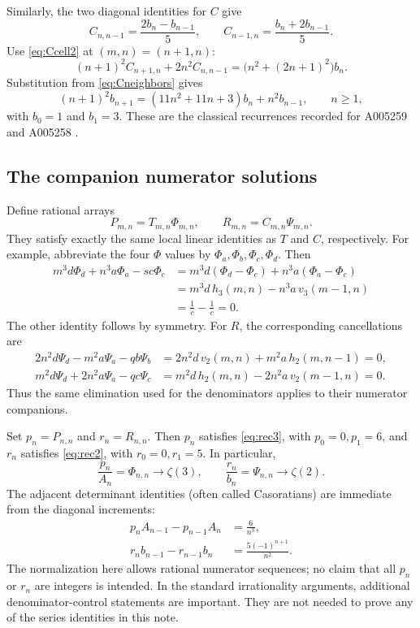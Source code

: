 \documentclass[11pt,letterpaper]{article}
\numberwithin{equation}{section}
\theoremstyle{definition}
\newcommand{\zthree}{\zeta(3)}
\newcommand{\ztwo}{\zeta(2)}
\begin{document}
Similarly, the two diagonal identities for $C$ give
\begin{equation}\label{eq:Cneighbors}
 C_{n,n-1}=\frac{2b_n-b_{n-1}}5,\qquad
 C_{n-1,n}=\frac{b_n+2b_{n-1}}5.
\end{equation}
Use \eqref{eq:Ccell2} at $(m,n)=(n+1,n)$:
\[
 (n+1)^2C_{n+1,n}+2n^2C_{n,n-1}
 =\bigl(n^2+(2n+1)^2\bigr)b_n.
\]
Substitution from \eqref{eq:Cneighbors} gives
\begin{equation}\label{eq:rec2}
 (n+1)^2b_{n+1}=(11n^2+11n+3)b_n+n^2b_{n-1},
 \qquad n\geq1,
\end{equation}
with $b_0=1$ and $b_1=3$. These are the classical recurrences recorded
for A005259 and A005258 \cite{oeis259,oeis258}.

\subsection{The companion numerator solutions}

Define rational arrays
\begin{equation}\label{eq:numerators}
 P_{m,n}=T_{m,n}\Phi_{m,n},\qquad R_{m,n}=C_{m,n}\Psi_{m,n}.
\end{equation}
They satisfy exactly the same local linear identities as $T$ and $C$,
respectively. For example, abbreviate the four $\Phi$ values by
$\Phi_a,\Phi_b,\Phi_c,\Phi_d$. Then
\begin{align*}
 m^3d\Phi_d+n^3a\Phi_a-sc\Phi_c
 &=m^3d(\Phi_d-\Phi_c)+n^3a(\Phi_a-\Phi_c)\\
 &=m^3d\,h_3(m,n)-n^3a\,v_3(m-1,n)\\
 &=\frac1c-\frac1c=0.
\end{align*}
The other identity follows by symmetry.
For $R$, the corresponding cancellations are
\begin{align*}
 2n^2d\Psi_d-m^2a\Psi_a-qb\Psi_b
 &=2n^2d\,v_2(m,n)+m^2a\,h_2(m,n-1)=0,\\
 m^2d\Psi_d+2n^2a\Psi_a-qc\Psi_c
 &=m^2d\,h_2(m,n)-2n^2a\,v_2(m-1,n)=0.
\end{align*}
Thus the same elimination used for the denominators applies to their
numerator companions.

Set $p_n=P_{n,n}$ and $r_n=R_{n,n}$. Then $p_n$ satisfies
\eqref{eq:rec3}, with $p_0=0,p_1=6$, and $r_n$ satisfies
\eqref{eq:rec2}, with $r_0=0,r_1=5$. In particular,
\[
 \frac{p_n}{A_n}=\Phi_{n,n}\longrightarrow\zthree,\qquad
 \frac{r_n}{b_n}=\Psi_{n,n}\longrightarrow\ztwo.
\]
The adjacent determinant identities (often called Casoratians) are
immediate from the diagonal increments:
\begin{align}
 p_nA_{n-1}-p_{n-1}A_n&=\frac6{n^3},\label{eq:cas3}\\
 r_nb_{n-1}-r_{n-1}b_n&=\frac{5(-1)^{n+1}}{n^2}.\label{eq:cas2}
\end{align}
The normalization here allows rational numerator sequences; no claim
that all $p_n$ or $r_n$ are integers is intended. In the standard
irrationality arguments, additional denominator-control statements are
important. They are not needed to prove any of the series identities
in this note.
\end{document}
